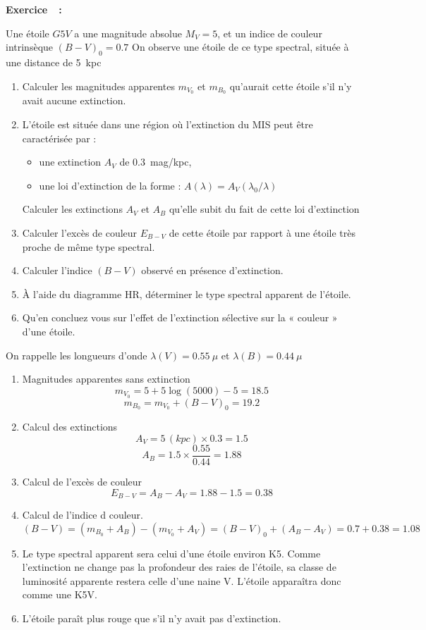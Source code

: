 \documentclass[a4paper,10pt]{report}
\newcounter{noexo}
\newenvironment{Exercise}[1][]{%
  \stepcounter{noexo}
  \medskip\noindent\textbf{Exercice~\thenoexo~:~#1}
  \medskip\par
  \addcontentsline{toc}{subsubsection}{Exercice~\thenoexo~:~#1}
}{}
\begin{document}
\begin{Exercise}
  Une étoile $G5V$ a une magnitude absolue $M_V= 5$, et un indice de
  couleur intrinsèque $(B-V)_0 =0.7$ On observe une étoile de ce type
  spectral, située à une distance de 5~kpc
  \begin{enumerate}
  \item Calculer les magnitudes apparentes $m_{V_0}$ et $m_{B_0}$
    qu'aurait cette étoile s'il n'y avait aucune extinction.
  \item L'étoile est située dans une région où l'extinction du MIS
    peut être caractérisée par :
    \begin{itemize}
    \item une extinction $A_V$ de 0.3~mag/kpc,
    \item une loi d'extinction de la forme : $A(\lambda) = A_V
      (\lambda_0/\lambda)$
    \end{itemize}
    Calculer les extinctions $A_V$ et $A_B$ qu'elle subit du fait de
    cette loi d'extinction
  \item Calculer l'excès de couleur $E_{B-V}$ de cette étoile par
    rapport à une étoile très proche de même type spectral.
  \item Calculer l'indice $(B-V)$ observé en présence d'extinction.
  \item À l'aide du diagramme HR, déterminer le type spectral apparent
    de l'étoile.
  \item Qu'en concluez vous sur l'effet de l'extinction sélective sur
    la « couleur » d'une étoile.
  \end{enumerate}

  On rappelle les longueurs d'onde $\lambda(V)=0.55~\mu$ et
  $\lambda(B)=0.44~\mu$
\end{Exercise}

\begin{Answer}
  \begin{enumerate}
  \item Magnitudes apparentes sans extinction
    $$
    m_{V_0} = 5 + 5\log(5000) -5 = 18.5
    $$
    $$
    m_{B_0} = m_{V_0} + (B-V)_0 = 19.2
    $$
  \item Calcul des extinctions
    $$
    A_V = 5\,(kpc)\times 0.3=1.5
    $$
    $$
    A_B = 1.5 \times \frac{0.55}{0.44} = 1.88
    $$
  \item Calcul de l'excès de couleur
    $$
    E_{B-V} = A_B-A_V = 1.88 - 1.5 = 0.38
    $$
  \item Calcul de l'indice d couleur.
    $$
    (B-V) = (m_{B_0} +A_B) - (m_{V_0} +A_V) = (B-V)_0 + (A_B- A_V) =
    0.7 + 0.38 = 1.08
    $$
  \item Le type spectral apparent sera celui d'une étoile environ
    K5. Comme l'extinction ne change pas la profondeur des raies de
    l'étoile, sa classe de luminosité apparente restera celle d'une
    naine V. L'étoile apparaîtra donc comme une K5V.
  \item L'étoile paraît plus rouge que s'il n'y avait pas d'extinction.
  \end{enumerate}
\end{Answer}
\end{document}
